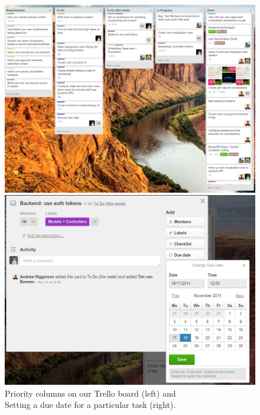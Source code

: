 \documentclass[a4paper]{article}
\begin{document}
\begin{figure}[H]
  \begin{minipage}{0.49\textwidth}
    \includegraphics[width = \textwidth]{./evaluation/trello-columns.png}
  \end{minipage}
  \begin{minipage}{0.49\textwidth}
    \includegraphics[width = \textwidth]{./evaluation/trello-due-date.png}
  \end{minipage}
  \caption{Priority columns on our Trello board (left) and\\
           Setting a due date for a particular task (right).}
  \label{fig:trello}
\end{figure}
\end{document}

